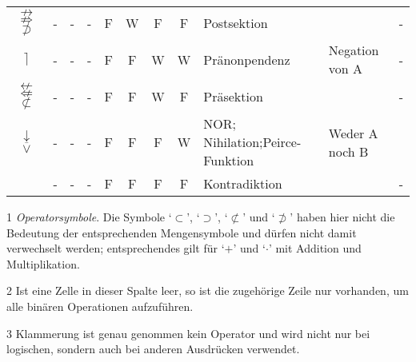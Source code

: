 \documentclass[english,ngerman,parskip=half,headsepline,footsepline,
	fleqn,notitlepage]{scrreprt}
\newcommand*{\texttrue}{W}%
\newcommand*{\textfalse}{F}%
\newcommand*{\lnimp}{\nrightarrow}%
\newcommand*{\lnimpA}{\nRightarrow}%
\newcommand*{\lnimpB}{\nsupset}%
\newcommand*{\lnleft}{\rceil}%
\newcommand*{\lnrep}{\nleftarrow}%
\newcommand*{\lnrepA}{\nLeftarrow}%
\newcommand*{\lnrepB}{\nsubset}%
\newcommand*{\lnor}{\downarrow}%
\newcommand*{\lnorA}{\operatorname{\overline\vee}}%
\newcommand*{\charqt}[1]{\enquote*{#1}}%
\newcommand*{\symqt}[1]{\charqt{#1}}%
\begin{document}
\begin{table}
\begin{threeparttable}
\begin{tabularx}{\linewidth-10.95pt}{c||c:cc:cccc|X:X|c|}
				$\lnimp$ $\lnimpA$ $\lnimpB$
				& - & - & - &\textfalse&\texttrue&\textfalse&\textfalse
				& Postsektion
				&
				& - \\

				\tablegroup%

				$\lnleft$
				& - & - & - &\textfalse&\textfalse&\texttrue&\texttrue
				& Pränonpendenz
				& Negation von A
				& - \\

				\tableline%

				$\lnrep$ $\lnrepA$ $\lnrepB$
				& - & - & - &\textfalse&\textfalse&\texttrue&\textfalse
				& Präsektion
				&
				& - \\

				\tableline%

				$\lnor$ $\lnorA$
				& - & - & - &\textfalse&\textfalse&\textfalse&\texttrue
				& NOR; Nihilation;\newline Peirce-Funktion
				& Weder A noch B
				& \thepnor \\

				\tableline%

				~
				& - & - & - &\textfalse&\textfalse&\textfalse&\textfalse
				& Kontradiktion
				&
				& - \\

				\hline%
			\end{tabularx}
			\begin{tablenotes}
				\footnotesize

				\item[1] \emph{Operatorsymbole}.
				Die Symbole \symqt{$\subset$}, \symqt{$\supset$},
				\symqt{$\nsubset$} und \symqt{$\nsupset$} haben hier nicht die
				Bedeutung der entsprechenden Mengensymbole
				und dürfen nicht damit verwechselt werden;
				entsprechendes gilt für \symqt{$+$} und \symqt{$\cdot$}
				mit Addition und Multiplikation.

				\item[2] Ist eine Zelle in dieser Spalte leer,
				so ist die zugehörige Zeile nur vorhanden,
				um alle binären Operationen aufzuführen.

				\item[3] Klammerung ist genau genommen kein Operator
				und wird nicht nur bei logischen,
				sondern auch bei anderen Ausdrücken verwendet.


\end{tablenotes}
\end{threeparttable}
\end{table}
\end{document}
